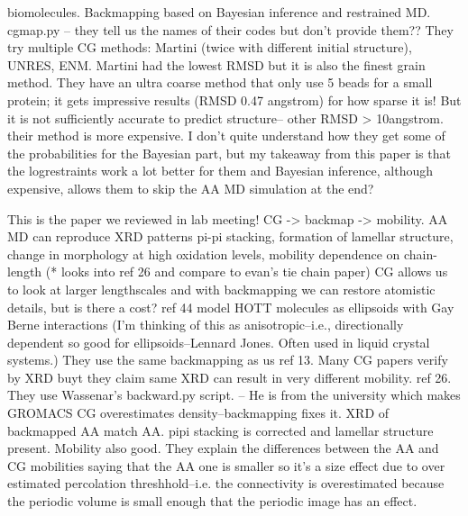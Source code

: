 \documentclass{article}
\begin{document}
\cite{Peng2019a}

biomolecules. Backmapping based on Bayesian inference and restrained MD. cgmap.py -- they tell us the names of their codes but don't provide them?? They try multiple CG methods: Martini (twice with different initial structure), UNRES, ENM. Martini had the lowest RMSD but it is also the finest grain method. They have an ultra coarse method that only use 5 beads for a small protein; it gets impressive results (RMSD 0.47 angstrom) for how sparse it is! But it is not sufficiently accurate to predict structure-- other RMSD > 10angstrom. their method is more expensive. I don't quite understand how they get some of the probabilities for the Bayesian part, but my takeaway from this paper is that the logrestraints work a lot better for them and Bayesian inference, although expensive, allows them to skip the AA MD simulation at the end?

\cite{Rolland2020a}

This is the paper we reviewed in lab meeting! CG -> backmap -> mobility. AA MD can reproduce XRD patterns pi-pi stacking, formation of lamellar structure, change in morphology at high oxidation levels, mobility dependence on chain-length (* looks into ref 26 and compare to evan's tie chain paper)
CG allows us to look at larger lengthscales and with backmapping we can restore atomistic details, but is there a cost? ref 44 model HOTT molecules as ellipsoids with Gay Berne interactions (I'm thinking of this as anisotropic--i.e., directionally dependent so good for ellipsoids--Lennard Jones. Often used in liquid crystal systems.) 
They use the same backmapping as us ref 13. Many CG papers verify by XRD buyt they claim same XRD can result in very different mobility. ref 26. They use Wassenar's backward.py script. -- He is from the university which makes GROMACS
CG overestimates density--backmapping fixes it. XRD of backmapped AA match AA. pipi stacking is corrected and lamellar structure present. Mobility also good. They explain the differences between the AA and CG mobilities saying that the AA one is smaller so it's a size effect due to over estimated percolation threshhold--i.e. the connectivity is overestimated because the periodic volume is small enough that the periodic image has an effect.
\end{document}
